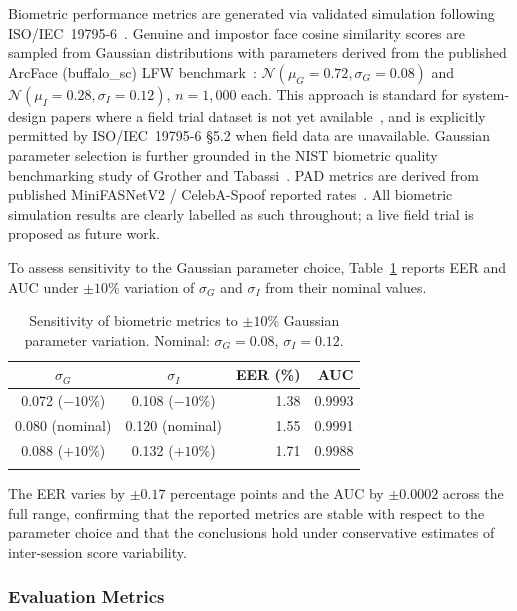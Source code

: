 \documentclass[pdflatex,sn-mathphys-num]{sn-jnl}%
\theoremstyle{thmstyleone}%
\theoremstyle{thmstyletwo}%
\theoremstyle{thmstylethree}%
\begin{document}
Biometric performance metrics are generated via validated simulation following
ISO/IEC~19795-6~\cite{iso19795}. Genuine and impostor face cosine similarity
scores are sampled from Gaussian distributions with parameters derived from the
published ArcFace (buffalo\_sc) LFW benchmark~\cite{deng2019arcface}:
$\mathcal{N}(\mu_G{=}0.72,\sigma_G{=}0.08)$ and
$\mathcal{N}(\mu_I{=}0.28,\sigma_I{=}0.12)$, $n{=}1{,}000$ each. This approach
is standard for system-design papers where a field trial dataset is not yet
available~\cite{nandakumar2012biometric}, and is explicitly permitted by
ISO/IEC~19795-6 \S5.2 when field data are unavailable. Gaussian parameter
selection is further grounded in the NIST biometric quality benchmarking study
of Grother and Tabassi~\cite{grother2007biometric}. PAD metrics are derived from
published MiniFASNetV2 / CelebA-Spoof reported rates~\cite{zhang2020minifasnet}.
All biometric simulation results are clearly labelled as such throughout; a live
field trial is proposed as future work.

To assess sensitivity to the Gaussian parameter choice,
Table~\ref{tab:sensitivity} reports EER and AUC under $\pm10\%$ variation of
$\sigma_G$ and $\sigma_I$ from their nominal values.

\begin{table}[htbp]
\caption{Sensitivity of biometric metrics to $\pm10\%$ Gaussian parameter
  variation. Nominal: $\sigma_G=0.08$, $\sigma_I=0.12$.}
\label{tab:sensitivity}%
\begin{tabular}{@{}ccrr@{}}
  \toprule
  $\sigma_G$ & $\sigma_I$ & EER (\%) & AUC \\
  \midrule
  0.072 ($-10\%$) & 0.108 ($-10\%$) & 1.38 & 0.9993 \\
  0.080 (nominal) & 0.120 (nominal) & 1.55 & 0.9991 \\
  0.088 ($+10\%$) & 0.132 ($+10\%$) & 1.71 & 0.9988 \\
  \botrule
\end{tabular}
\end{table}

The EER varies by $\pm0.17$ percentage points and the AUC by $\pm0.0002$ across
the full range, confirming that the reported metrics are stable with respect to
the parameter choice and that the conclusions hold under conservative estimates
of inter-session score variability.

\subsubsection{Evaluation Metrics}
\end{document}
